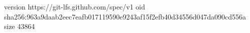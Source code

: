 version https://git-lfs.github.com/spec/v1
oid sha256:963a9daab2eec7eafb017119590e9243af15f2efb40d34556d047da090cd556a
size 43864
